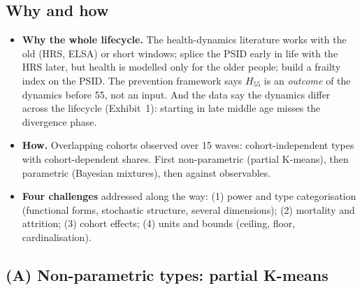 \documentclass[11pt]{article}
\begin{document}
\subsection{Why and how}

\begin{itemize}
\item \textbf{Why the whole lifecycle.} The health-dynamics literature works with the old (HRS, ELSA) or short windows; \citet{denardi2017} splice the PSID early in life with the HRS later, but health is modelled only for the older people; \citet{hosseini2022} build a frailty index on the PSID. The prevention framework says $H_{55}$ is an \emph{outcome} of the dynamics before 55, not an input. And the data say the dynamics differ across the lifecycle (Exhibit~1): starting in late middle age misses the divergence phase.
\item \textbf{How.} Overlapping cohorts observed over 15 waves: cohort-independent types with cohort-dependent shares. First non-parametric (partial K-means), then parametric (Bayesian mixtures), then against observables.
\item \textbf{Four challenges} addressed along the way: (1) power and type categorisation (functional forms, stochastic structure, several dimensions); (2) mortality and attrition; (3) cohort effects; (4) units and bounds (ceiling, floor, cardinalisation).
\end{itemize}

\subsection{(A) Non-parametric types: partial K-means}
\end{document}
